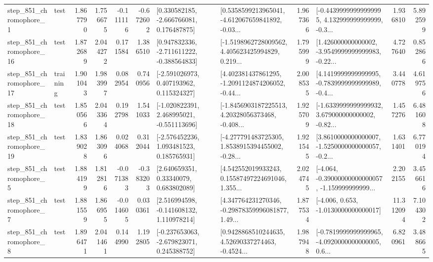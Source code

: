 \begin{tabular}{llrrrrllrlrr}
   step\_851\_chromophore\_1 &      test &      1.867790 &    1.756675 &     -0.111116 & -0.672602 &    [0.330582185, -2.666766081, 0.176487875] &  [0.5358599213965041, -4.612067659841892, -0.03... &       1.967366 &  [-0.44399999999999995, 4.132999999999999, -0.3... &            1.936810 &          5.892599 \\
  step\_851\_chromophore\_16 &      test &      1.872689 &    2.044272 &      0.171584 &  1.386510 &   [0.947832336, -2.711611222, -0.388564833] &  [-1.5198962728009562, 4.405623425994829, 0.219... &       1.795999 &  [1.426000000000002, -3.9549999999999983, -0.22... &            4.727640 &          0.852866 \\
  step\_851\_chromophore\_17 &  training &      1.901043 &    1.983997 &      0.082954 &  0.740956 &    [-2.591026973, 0.407193962, 0.115324327] &  [4.402381437861295, -1.2091124874206052, -0.44... &       2.008535 &  [4.1419999999999995, -0.7839999999999989, -0.4... &            3.440778 &          4.619756 \\
  step\_851\_chromophore\_18 &      test &      1.850566 &    2.043364 &      0.192798 &  1.541033 &   [-1.020822391, 2.468995021, -0.551113696] &  [-1.8456903187225513, 4.20328056373468, -0.408... &       1.925709 &  [-1.6339999999999932, 3.679000000000002, -0.82... &            1.457276 &          6.481608 \\
  step\_851\_chromophore\_19 &      test &      1.839028 &    1.863096 &      0.024068 &  0.312044 &    [-2.576452236, 1.093481523, 0.185765931] &  [-4.277791483725305, 1.8538915394455002, -0.28... &       1.921545 &  [3.8610000000000007, -1.5250000000000057, -0.2... &            1.631401 &          6.770194 \\
   step\_851\_chromophore\_5 &      test &      1.884199 &    1.812816 &     -0.071383 & -0.383203 &      [2.640659351, 0.33340079, 0.683802089] &  [4.542552019933243, 0.15587497224691046, 1.355... &       2.024745 &  [-4.064, -0.39000000000000057, -1.159999999999... &            2.202155 &          3.456616 \\
   step\_851\_chromophore\_7 &      test &      1.881559 &    1.866955 &     -0.014605 &  0.030361 &    [2.516994598, -0.141608132, 1.110978214] &  [4.347764231270346, -0.29878359996081877, 1.49... &       1.877534 &               [-4.006, 0.653, -1.0130000000000017] &           11.312094 &          7.104302 \\
   step\_851\_chromophore\_8 &      test &      1.896471 &    2.041461 &      0.144990 &  1.192805 &   [-0.237653063, -2.679823071, 0.245388752] &  [0.9428868510244635, 4.52690337274463, -0.4524... &       1.987948 &  [-0.7819999999999965, -4.0920000000000005, 0.6... &            6.820961 &          3.488665 \\

\end{tabular}
